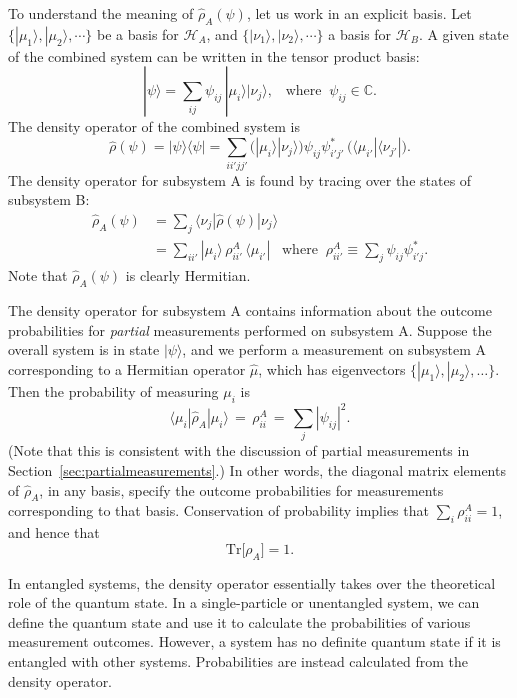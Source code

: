 \documentclass[pra,12pt]{revtex4}
\begin{document}
To understand the meaning of $\hat{\rho}_A(\psi)$, let us work in
an explicit basis.  Let $\{|\mu_1\rangle, |\mu_2\rangle,\cdots\}$ be a
basis for $\mathscr{H}_A$, and $\{|\nu_1\rangle,
|\nu_2\rangle,\cdots\}$ a basis for $\mathscr{H}_B$.  A given state of
the combined system can be written in the tensor product basis:
$$|\psi\rangle = \sum_{ij} \psi_{ij} \, |\mu_i\rangle  |\nu_j\rangle, \;\;\; \mathrm{where}\;\; \psi_{ij} \in \mathbb{C}.$$
The density operator of the combined system is
$$\hat{\rho}(\psi) = |\psi\rangle \langle\psi| = \sum_{ii'jj'} \Big( |\mu_i\rangle  |\nu_j\rangle\Big) \psi_{ij} \psi_{i'j'}^* \, \Big(\langle \mu_{i'}|  \langle \nu_{j'}|\Big).$$
The density operator for subsystem A is found by tracing over
the states of subsystem B:
$$\begin{aligned}\hat{\rho}_A(\psi) &= \sum_j \langle \nu_j | \hat{\rho}(\psi) | \nu_j \rangle \\ &= \sum_{ii'} |\mu_i\rangle \,\rho_{ii'}^A \, \langle \mu_{i'}| \;\;\;\mathrm{where} \;\; \rho_{ii'}^A \equiv \sum_j \psi_{ij} \psi_{i'j}^*.\end{aligned}$$
Note that $\hat{\rho}_A(\psi)$ is clearly Hermitian.

The density operator for subsystem A contains information about the
outcome probabilities for \textit{partial} measurements performed on
subsystem A.  Suppose the overall system is in state $|\psi\rangle$,
and we perform a measurement on subsystem A corresponding to a
Hermitian operator $\hat{\mu}$, which has eigenvectors
$\{|\mu_1\rangle,|\mu_2\rangle,\dots\}$.  Then the probability of
measuring $\mu_i$ is
$$\langle \mu_i | \hat{\rho}_A |\mu_i \rangle \,=\, \rho_{ii}^A \,=\, \sum_{j} |\psi_{ij}|^2.$$
(Note that this is consistent with the discussion of partial
measurements in Section~\ref{sec:partialmeasurements}.)  In other
words, the diagonal matrix elements of $\hat{\rho}_A$, in any basis,
specify the outcome probabilities for measurements corresponding to
that basis.  Conservation of probability implies that $\sum_i
\rho^A_{ii} = 1$, and hence that
$$\mathrm{Tr}\big[\rho_A\big] = 1.$$

In entangled systems, the density operator essentially takes over the
theoretical role of the quantum state.  In a single-particle or
unentangled system, we can define the quantum state and use it to
calculate the probabilities of various measurement outcomes.  However,
a system has no definite quantum state if it is entangled with other
systems.  Probabilities are instead calculated from the density
operator.
\end{document}
